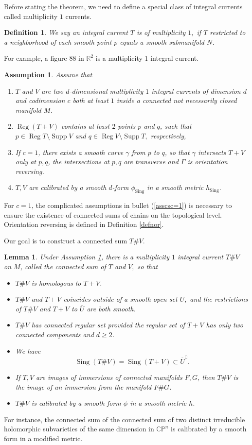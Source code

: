 \documentclass[11pt,a4paper]{amsart}
\numberwithin{equation}{section}
\newcommand{\supp}{\operatorname{Supp}}
\newcommand{\reg}{{\operatorname{Reg}}}
\newcommand{\sing}{{\operatorname{Sing}}}
\newcommand{\Ga}{\Gamma}
\newcommand{\ga}{\gamma}
\newcommand{\s}{\subset}
\newcommand{\cp}{^\complement}
\newcommand{\ov}[1]{\overline{#1}}
\newcommand{\R}{\mathbb{R}}
\theoremstyle{plain}
\newtheorem{lem}[exam]{Lemma}
\newtheorem{assump}[exam]{Assumption}
\newtheorem{defn}[exam]{Definition}
\theoremstyle{definition}
\numberwithin{equation}{subsection}
\begin{document}
	Before stating the theorem, we need to define a special class of integral currents called multiplicity $1$ currents.
	\begin{defn}\label{defnmo}
		We say an integral current $T$ is of multiplicity $1,$ if $T$ restricted to a neighborhood of each smooth point $p$ equals a smooth submanifold $N$.
	\end{defn}
	For example, a figure $88$ in $\R^2$ is a multiplicity $1$ integral current.
	\begin{assump}\label{assumpcs}
		Assume that \begin{enumerate}
			\item $T$ and $V$ are two $d$-dimensional multiplicity $1$ integral currents of dimension $d$ and codimension $c$ both at least $1$ inside a connected not necessarily closed manifold $M$. 
			\item $\reg (T+V)$ contains at least $2$ points $p$ and $q$, such that $p\in\reg T\setminus\supp V$ and $q\in\reg V\setminus\supp T,$ respectively,\label{defnregtv}
			\item If $c=1$, there exists a smooth curve $\ga$ from $p$ to $q$, so that $\ga$ intersects $T+V$ only at $p,q$, the intersections at $p,q$ are transverse and $\Ga$ is orientation reversing.\label{asscsc=1}
			\item $T,V$ are calibrated by a smooth $d$-form $\phi_\sing$ in a smooth metric $h_\sing.$\label{defnpsing}
		\end{enumerate}
	\end{assump}	
	For $c=1$, the complicated assumptions in bullet (\ref{asscsc=1}) is necessary to ensure the existence of connected sums of chains on the topological level. Orientation reversing is defined in Definition \ref{defnor}.
	
	Our goal is to construct a connected sum $T\# V$. 
	\begin{lem}\label{lemcs}Under Assumption \ref{assumpcs},
		there is a multiplicity $1$ integral current $T\# V$ on $M$, called the connected sum of $T$ and $V,$ so that 
		\begin{itemize}
			\item $T\# V$ is homologous to $T+V$.
			\item $T\#V$ and $T+V$ coincides outside of a smooth open set $U,$ and the restrictions of $T\#V$ and $T+V$ to $\ov{U}$ are both smooth.
			\item $T\# V$ has connected regular set provided the regular set of $T+V$ has only two connected components and $d\ge 2$.
			\item We have $$\sing (T\# V)=\sing (T+V)\s \ov{U}\cp.$$
			\item If $T,V$ are images of immersions of connected manifolds $F,G$, then $T\#V$ is the image of an immersion from the manifold $F\# G$.
			\item $T\# V$ is calibrated by a smooth form $\phi$ in a smooth metric $h.$
		\end{itemize}
	\end{lem}
	For instance, the connected sum of the connected sum of two distinct irreducible holomorphic subvarieties of the same dimension in $\mathbb{CP}^n$ is calibrated by a smooth form in a modified metric.
	
\end{document}
